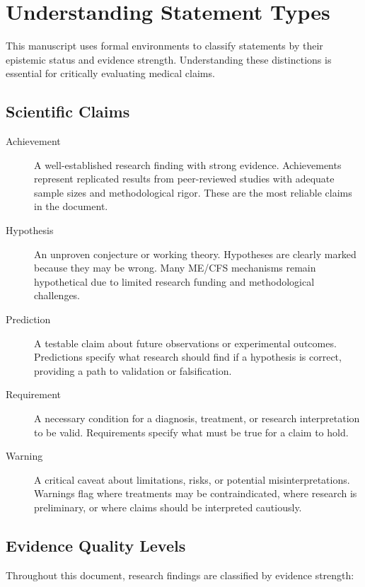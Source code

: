 \section*{Understanding Statement Types}

This manuscript uses formal environments to classify statements by their epistemic status and evidence strength. Understanding these distinctions is essential for critically evaluating medical claims.

\subsection*{Scientific Claims}

\begin{description}
\item[Achievement] A well-established research finding with strong evidence. Achievements represent replicated results from peer-reviewed studies with adequate sample sizes and methodological rigor. These are the most reliable claims in the document.

\item[Hypothesis] An unproven conjecture or working theory. Hypotheses are clearly marked because they may be wrong. Many ME/CFS mechanisms remain hypothetical due to limited research funding and methodological challenges.

\item[Prediction] A testable claim about future observations or experimental outcomes. Predictions specify what research should find if a hypothesis is correct, providing a path to validation or falsification.

\item[Requirement] A necessary condition for a diagnosis, treatment, or research interpretation to be valid. Requirements specify what must be true for a claim to hold.

\item[Warning] A critical caveat about limitations, risks, or potential misinterpretations. Warnings flag where treatments may be contraindicated, where research is preliminary, or where claims should be interpreted cautiously.
\end{description}

\subsection*{Evidence Quality Levels}

Throughout this document, research findings are classified by evidence strength:


